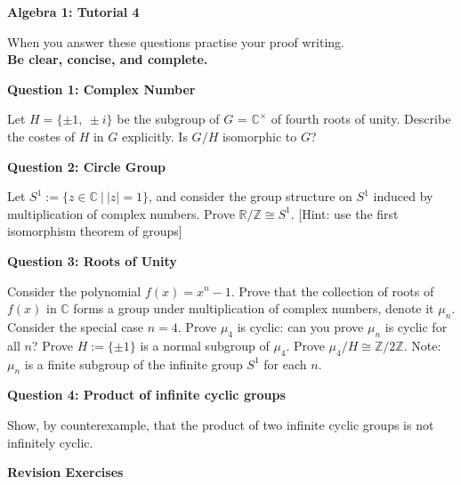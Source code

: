 \documentclass[11pt,twoside, a4paper]{report}
\theoremstyle{plain}
\theoremstyle{definition}
\begin{document}
\begin{center}
 \noindent\makebox[\linewidth]{\rule{14cm}{1.5pt}} 
{\bf Algebra 1: Tutorial 4 }
 \noindent\makebox[\linewidth]{\rule{14cm}{1.5pt}}  
 \noindent\makebox[\linewidth]{\rule{14cm}{3pt}}
\end{center}

\noindent When you answer these questions practise your proof writing.\\
  {\bf Be clear, concise, and complete.}
  
  
\begin{center}
{\bf Question 1: Complex Number}
\end{center}

Let $H = \{ \pm 1, \ \pm i \}$ be the subgroup of $G$ = $\mathbb{C}^\times$ of fourth roots of unity. 
	Describe the costes of $H$ in $G$ explicitly. 
	Is $G/H$ isomorphic to $G$?
	


  
\begin{center}
{\bf Question 2: Circle Group}
\end{center}

Let $S^{1}:=\{z \in \mathbb{C} \ | \ |z|=1\}$, and consider the group structure on $S^{1}$ induced by multiplication of complex numbers. Prove $\mathbb{R}/\mathbb{Z} \cong S^{1}$. [Hint: use the first isomorphism theorem of groups]

  
  
  
\begin{center}
{\bf Question 3: Roots of Unity}
\end{center}

Consider the polynomial $f(x)=x^{n} - 1$. Prove that the collection of roots of $f(x)$ in $\mathbb{C}$ forms a group under multiplication of complex numbers, denote it $\mu_{n}$. Consider the special case $n=4$. Prove $\mu_{4}$ is cyclic: can you prove $\mu_{n}$ is cyclic for all $n$? Prove $H:=\{\pm 1\}$ is a normal subgroup of $\mu_{4}$. Prove $\mu_{4}/H\cong \mathbb{Z}/2\mathbb{Z}$. Note: $\mu_{n}$ is a finite subgroup of the infinite group $S^{1}$ for each $n$. 

\begin{center}
{\bf Question 4: Product of infinite cyclic groups}
\end{center}


Show, by counterexample, that the product of two infinite cyclic groups is not infinitely cyclic.


\begin{center}
{\bf Revision Exercises}
\end{center}
\end{document}
